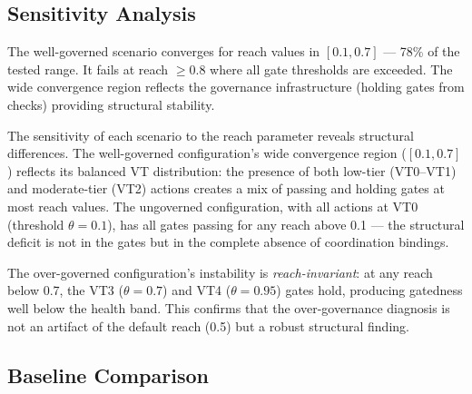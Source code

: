 \documentclass[sigconf,nonacm]{acmart}
\begin{document}
\subsection{Sensitivity Analysis}

The well-governed scenario converges for reach values in $[0.1, 0.7]$ ---
78\% of the tested range. It fails at reach $\geq 0.8$ where all gate
thresholds are exceeded. The wide convergence region reflects the governance
infrastructure (holding gates from checks) providing structural stability.

The sensitivity of each scenario to the reach parameter reveals
structural differences. The well-governed configuration's wide convergence
region ($[0.1, 0.7]$) reflects its balanced VT distribution: the presence
of both low-tier (VT0--VT1) and moderate-tier (VT2) actions creates a
mix of passing and holding gates at most reach values. The ungoverned
configuration, with all actions at VT0 (threshold $\theta = 0.1$), has
all gates passing for any reach above 0.1 --- the structural deficit is
not in the gates but in the complete absence of coordination bindings.

The over-governed configuration's instability is \emph{reach-invariant}:
at any reach below 0.7, the VT3 ($\theta = 0.7$) and VT4 ($\theta = 0.95$)
gates hold, producing gatedness well below the health band. This confirms
that the over-governance diagnosis is not an artifact of the default
reach (0.5) but a robust structural finding.

\subsection{Baseline Comparison}
\end{document}
